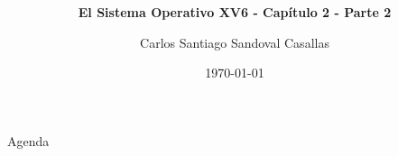 \documentclass{libs/ufc_format}
\title[Sistemas Operativos]{\huge\textbf{}}
\subtitle{\textbf{El Sistema Operativo XV6 - Capítulo 2 - Parte 2}}
\author{Carlos Santiago Sandoval Casallas}
\institute[UNAL]{
    \normalsize{\email{csandovalc@unal.edu.co}}
    \newline
    \department{Departamento de Ingeniería de Sistemas e Industrial}
    \newline
    \ufc
}
\date{\today}
\begin{document}


\begin{frame}
    \maketitle
\end{frame}

\begin{frame}{Agenda}
        \tableofcontents
\end{frame}
\end{document}
